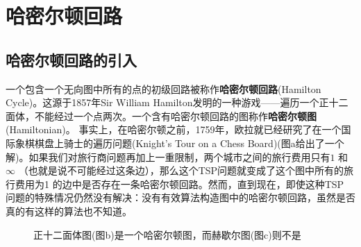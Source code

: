 \documentclass[a4paper,11pt]{book}
\begin{document}
\section{哈密尔顿回路}

\subsection{哈密尔顿回路的引入} 一个包含一个无向图中所有的点的初级回路被称作\textbf{哈密尔顿回路}(Hamilton Cycle)。这源于1857年Sir William Hamilton发明的一种游戏——遍历一个正十二面体，不能经过一个点两次。一个含有哈密尔顿回路的图称作\textbf{哈密尔顿图}(Hamiltonian)。 事实上，在哈密尔顿之前，1759年，欧拉就已经研究了在一个国际象棋棋盘上骑士的遍历问题(Knight's Tour on a Chess Board)(图a给出了一个解)。如果我们对旅行商问题再加上一重限制，两个城市之间的旅行费用只有$1$ 和$\infty$ （也就是说不可能经过这条边），那么这个TSP问题就变成了这个图中所有的旅行费用为1 的边中是否存在一条哈密尔顿回路。然而，直到现在，即使这种TSP 问题的特殊情况仍然没有解决：没有有效算法构造图中的哈密尔顿回路，虽然是否真的有这样的算法也不知道。
\begin{figure}[H]
\centering
{}
\caption{正十二面体图(图b)是一个哈密尔顿图，而赫歇尔图(图c)则不是}
\label{Fig.lable}
\end{figure}
\end{document}
